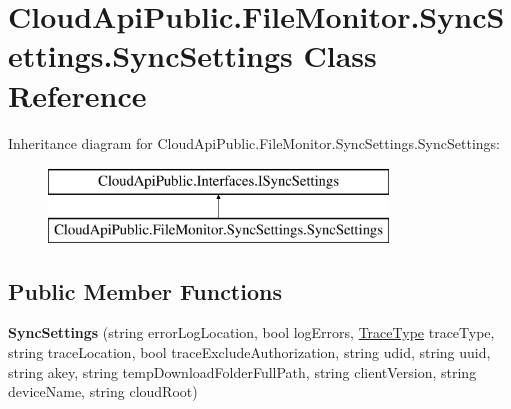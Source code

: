 \hypertarget{class_cloud_api_public_1_1_file_monitor_1_1_sync_settings_1_1_sync_settings}{\section{Cloud\-Api\-Public.\-File\-Monitor.\-Sync\-Settings.\-Sync\-Settings Class Reference}
\label{class_cloud_api_public_1_1_file_monitor_1_1_sync_settings_1_1_sync_settings}
}
Inheritance diagram for Cloud\-Api\-Public.\-File\-Monitor.\-Sync\-Settings.\-Sync\-Settings\-:\begin{figure}[H]
\begin{center}
\leavevmode
\includegraphics[height=2.000000cm]{class_cloud_api_public_1_1_file_monitor_1_1_sync_settings_1_1_sync_settings}
\end{center}
\end{figure}
\subsection*{Public Member Functions}
\begin{DoxyCompactItemize}
\item 
\hypertarget{class_cloud_api_public_1_1_file_monitor_1_1_sync_settings_1_1_sync_settings_ac2260a5c82506c66f579589db2ffe0ae}{{\bfseries Sync\-Settings} (string error\-Log\-Location, bool log\-Errors, \hyperlink{namespace_cloud_api_public_1_1_static_a7e5ae8f2a85f427de3d6c8a5afcbb029}{Trace\-Type} trace\-Type, string trace\-Location, bool trace\-Exclude\-Authorization, string udid, string uuid, string akey, string temp\-Download\-Folder\-Full\-Path, string client\-Version, string device\-Name, string cloud\-Root)}\label{class_cloud_api_public_1_1_file_monitor_1_1_sync_settings_1_1_sync_settings_ac2260a5c82506c66f579589db2ffe0ae}

\end{DoxyCompactItemize}
